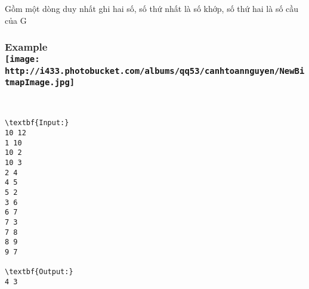 Gồm một dòng duy nhất ghi hai số, số thứ nhất là số khớp, số thứ hai là số cầu của G

\subsubsection{Example
\\
\texttt{[image: http://i433.photobucket.com/albums/qq53/canhtoannguyen/NewBitmapImage.jpg]}}

 
\begin{verbatim}
\textbf{Input:}
10 12
1 10
10 2
10 3
2 4
4 5
5 2
3 6
6 7
7 3
7 8
8 9
9 7

\textbf{Output:}
4 3\end{verbatim}